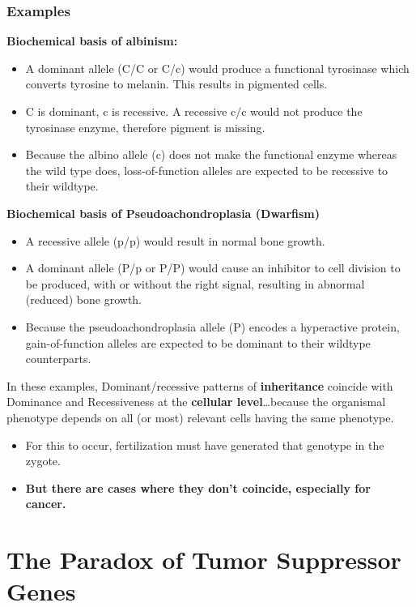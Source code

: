 \documentclass[10pt]{article}
\begin{document}
\subsubsection*{Examples}
\textbf{Biochemical basis of albinism:}
\begin{itemize}
	\item A dominant allele (C/C or C/c) would produce a functional tyrosinase which converts tyrosine to melanin.  This results in pigmented cells.
	\item C is dominant, c is recessive.  A recessive c/c would not produce the tyrosinase enzyme, therefore pigment is missing.
	\item Because the albino allele (c) does not make the functional enzyme whereas the wild type does, loss-of-function alleles are expected to be recessive to their wildtype.
\end{itemize}
\textbf{Biochemical basis of Pseudoachondroplasia (Dwarfism)}
\begin{itemize}
	\item A recessive allele (p/p) would result in normal bone growth.
	\item A dominant allele (P/p or P/P) would cause an inhibitor to cell division to be produced, with or without the right signal, resulting in abnormal (reduced) bone growth.
	\item Because the pseudoachondroplasia allele (P) encodes a hyperactive protein, gain-of-function alleles are expected to be dominant to their wildtype counterparts.
\end{itemize}
In these examples, Dominant/recessive patterns of \textbf{inheritance} coincide with Dominance and Recessiveness at the \textbf{cellular level}\dots because the organismal phenotype depends on all (or most) relevant cells having the same phenotype.
\begin{itemize}
	\item For this to occur, fertilization must have generated that genotype in the zygote.  
	\item \textbf{But there are cases where they don't coincide, especially for cancer.}
\end{itemize}

\section*{The Paradox of Tumor Suppressor Genes}
\end{document}
